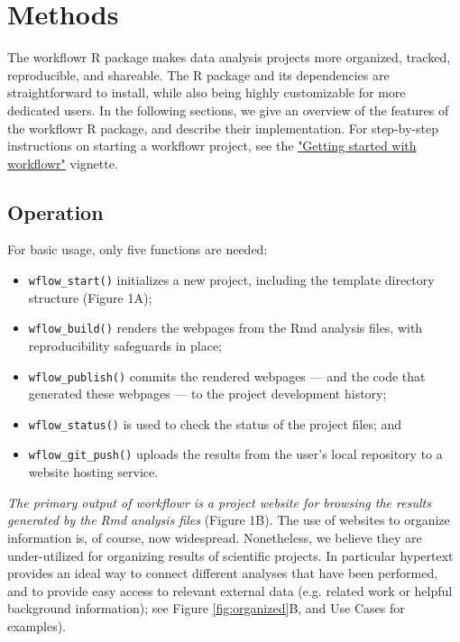\documentclass[9pt,a4paper]{extarticle}
\begin{document}
\section*{Methods}

The workflowr R package makes data analysis projects more organized,
tracked, reproducible, and shareable. The R package and its dependencies
are straightforward to install, while also being highly customizable for
more dedicated users. In the following sections, we give an overview of
the features of the workflowr R package, and describe their
implementation. For step-by-step instructions on starting a workflowr
project, see the
\href{https://jdblischak.github.io/workflowr/articles/wflow-01-getting-started.html}{"Getting
started with workflowr"} vignette.

\subsection*{Operation}

For basic usage, only five functions are needed:

\begin{itemize}

\item \texttt{wflow\_start()} initializes a new project, including the template
directory structure (Figure 1A);

\item \texttt{wflow\_build()} renders the webpages from the Rmd analysis files,
with reproducibility safeguards in place;

\item \texttt{wflow\_publish()} commits the rendered webpages --- and the code
that generated these webpages --- to the project development history;

\item \texttt{wflow\_status()} is used to check the status of the project files;
and

\item \texttt{wflow\_git\_push()} uploads the results from the user's local
repository to a website hosting service.

\end{itemize}

\textit{The primary output of workflowr is a project website for
browsing the results generated by the Rmd analysis files} (Figure 1B).
The use of websites to organize information is, of course, now
widespread. Nonetheless, we believe they are under-utilized for
organizing results of scientific projects. In particular hypertext
provides an ideal way to connect different analyses that have been
performed, and to provide easy access to relevant external data (e.g.
related work or helpful background information); see Figure \ref{fig:organized}B, and Use
Cases for examples).
\end{document}
